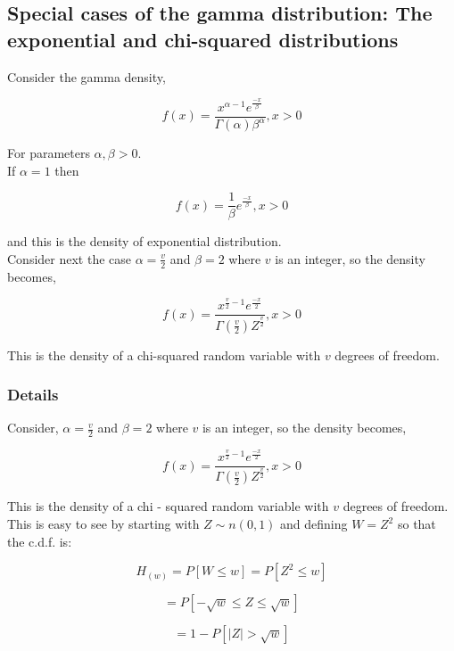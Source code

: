 \documentclass[12pt,a4paper]{article}
\theoremstyle{regla}
\theoremstyle{remark}
\theoremstyle{definition}
\theoremstyle{nonumberbreak}
\begin{document}
\subsection{Special cases of the gamma distribution: The exponential and chi-squared distributions}
\begin{fbox}
\begin{minipage}{0.97\textwidth}
Consider the gamma density,


$$ f(x) = \frac {x^{\alpha - 1} e^\frac{-x}{\beta}} {\Gamma(\alpha) \beta^{\alpha}} , x > 0$$

For parameters $\alpha, \beta > 0 $.\\

If $\alpha = 1 $ then

$$f(x) = \frac {1} {\beta} e^\frac{-x}{\beta}, x > 0$$

and this is the density of exponential distribution.\\

Consider next the case $ \alpha = \frac{v}{2}$ and $ \beta = 2$ where $v$ is an integer, so the density becomes,

 $$ f(x) = \frac {x^ {\frac{v}{2}- 1} e^\frac{-x}{2}} {\Gamma (\frac{v}{2}) Z^ \frac{v}{2}},  x > 0$$
 
This is the density of a chi-squared random variable with $v$ degrees of freedom.

\end{minipage}
\end{fbox}
\subsubsection{Details}
Consider, $ \alpha = \frac{v}{2}$ and $ \beta = 2$ where $v$ is an integer, so the density becomes,

 $$ f(x) = \frac {x^ {\frac{v}{2}- 1} e^\frac{-x}{2}} {\Gamma (\frac{v}{2}) Z^ \frac{v}{2}},  x > 0$$
 
This is the density of a chi - squared random variable with $v$ degrees of freedom.\\

This is easy to see by starting with $ Z \sim n(0,1)$ and defining $ W = Z^2$ so that the c.d.f. is:
 
$$H _(w) = P [W \leq w] = P [ Z^2 \leq w]$$

$$ = P [ - \sqrt{w}\leq Z \leq \sqrt{w}]$$

$$ = 1 - P [|Z| > \sqrt{w}]$$
 
\end{document}

